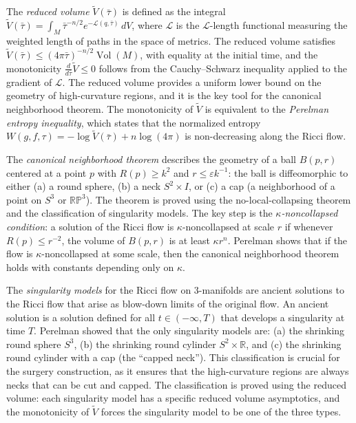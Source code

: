 The \emph{reduced volume} $\tilde{V}(\bar{\tau})$ is defined as the integral $\tilde{V}(\bar{\tau}) = \int_M \bar{\tau}^{-n/2} e^{-\mathcal{L}(q,\bar{\tau})} \, dV$, where $\mathcal{L}$ is the $\mathcal{L}$-length functional measuring the weighted length of paths in the space of metrics. The reduced volume satisfies $\tilde{V}(\bar{\tau}) \le (4\pi \bar{\tau})^{-n/2} \operatorname{Vol}(M)$, with equality at the initial time, and the monotonicity $\frac{d}{d\bar{\tau}} \tilde{V} \le 0$ follows from the Cauchy--Schwarz inequality applied to the gradient of $\mathcal{L}$. The reduced volume provides a uniform lower bound on the geometry of high-curvature regions, and it is the key tool for the canonical neighborhood theorem. The monotonicity of $\tilde{V}$ is equivalent to the \emph{Perelman entropy inequality}, which states that the normalized entropy $W(g,f,\tau) = -\log \tilde{V}(\bar{\tau}) + n \log(4\pi)$ is non-decreasing along the Ricci flow.

The \emph{canonical neighborhood theorem} describes the geometry of a ball $B(p, r)$ centered at a point $p$ with $R(p) \ge k^2$ and $r \le \varepsilon k^{-1}$: the ball is diffeomorphic to either (a) a round sphere, (b) a neck $S^2 \times I$, or (c) a cap (a neighborhood of a point on $S^3$ or $\mathbb{RP}^3$). The theorem is proved using the no-local-collapsing theorem and the classification of singularity models. The key step is the \emph{$\kappa$-noncollapsed condition}: a solution of the Ricci flow is $\kappa$-noncollapsed at scale $r$ if whenever $R(p) \le r^{-2}$, the volume of $B(p,r)$ is at least $\kappa r^n$. Perelman shows that if the flow is $\kappa$-noncollapsed at some scale, then the canonical neighborhood theorem holds with constants depending only on $\kappa$.

The \emph{singularity models} for the Ricci flow on 3-manifolds are ancient solutions to the Ricci flow that arise as blow-down limits of the original flow. An ancient solution is a solution defined for all $t \in (-\infty, T)$ that develops a singularity at time $T$. Perelman showed that the only singularity models are: (a) the shrinking round sphere $S^3$, (b) the shrinking round cylinder $S^2 \times \mathbb{R}$, and (c) the shrinking round cylinder with a cap (the ``capped neck''). This classification is crucial for the surgery construction, as it ensures that the high-curvature regions are always necks that can be cut and capped. The classification is proved using the reduced volume: each singularity model has a specific reduced volume asymptotics, and the monotonicity of $\tilde{V}$ forces the singularity model to be one of the three types.

